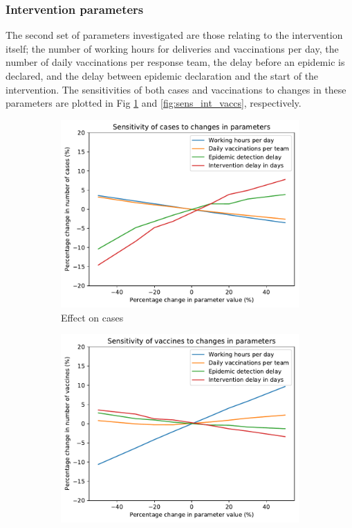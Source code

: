 \documentclass[10pt,letterpaper]{article}
\begin{document}
\subsubsection*{Intervention parameters}
The second set of parameters investigated are those relating to the intervention itself; the number of working hours for deliveries and vaccinations per day, the number of daily vaccinations per response team, the delay before an epidemic is declared, and the delay between epidemic declaration and the start of the intervention. The sensitivities of both cases and vaccinations to changes in these parameters are plotted in Fig \ref{fig:sens_int_cases} and \ref{fig:sens_int_vaccs}, respectively.

\begin{figure}[ht!]
  \begin{subfigure}[b]{0.5\textwidth}
    \includegraphics[width=\textwidth]{figures/sensitivity/intervention_param_cases.pdf}
    \caption{Effect on cases}
    \label{fig:sens_int_cases}
  \end{subfigure}
  \begin{subfigure}[b]{0.5\textwidth}
    \includegraphics[width=\textwidth]{figures/sensitivity/intervention_param_vaccines.pdf}

\end{subfigure}
\end{figure}
\end{document}
